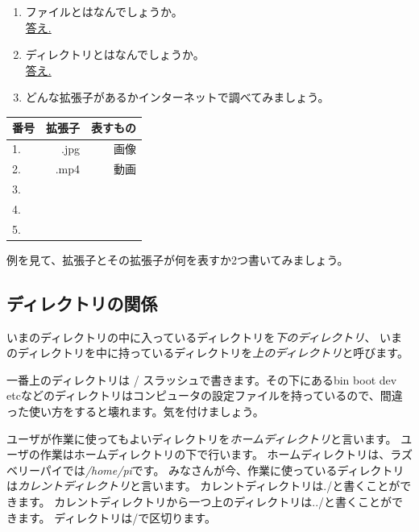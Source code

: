 \begin{tcolorbox}[title=\useOmetoi]
\begin{enumerate}
\item ファイルとはなんでしょうか。\\
\underline{答え.\hspace{0.8\linewidth}}
\item ディレクトリとはなんでしょうか。\\
\underline{答え.\hspace{0.8\linewidth}}
\item どんな拡張子があるかインターネットで調べてみましょう。
\end{enumerate}

\begin{table}[H]
  \centering
  \begin{tabular}{lrr} \toprule
番号 & 拡張子 & 表すもの \\ \midrule
1. & .jpg & 画像 \\
2. & .mp4 & 動画 \\
3. & \hspace{10\zw} & \hspace{10\zw} \\
4. & \hspace{10\zw} & \hspace{10\zw} \\
5. & \hspace{10\zw} & \hspace{10\zw} \\ \bottomrule
\end{tabular}
\end{table}
例を見て、拡張子とその拡張子が何を表すか2つ書いてみましょう。
\end{tcolorbox}

\subsection{ディレクトリの関係}
いまのディレクトリの中に入っているディレクトリを\emph{下のディレクトリ}、
いまのディレクトリを中に持っているディレクトリを\emph{上のディレクトリ}と呼びます。

一番上のディレクトリは / スラッシュで書きます。その下にあるbin boot dev etcなどのディレクトリはコンピュータの設定ファイルを持っているので、間違った使い方をすると壊れます。気を付けましょう。

ユーザが作業に使ってもよいディレクトリを\emph{ホームディレクトリ}と言います。
ユーザの作業はホームディレクトリの下で行います。
ホームディレクトリは、ラズベリーパイでは\emph{/home/pi}です。
みなさんが今、作業に使っているディレクトリは\emph{カレントディレクトリ}と言います。
カレントディレクトリは./と書くことができます。
カレントディレクトリから一つ上のディレクトリは../と書くことができます。
ディレクトリは/で区切ります。

